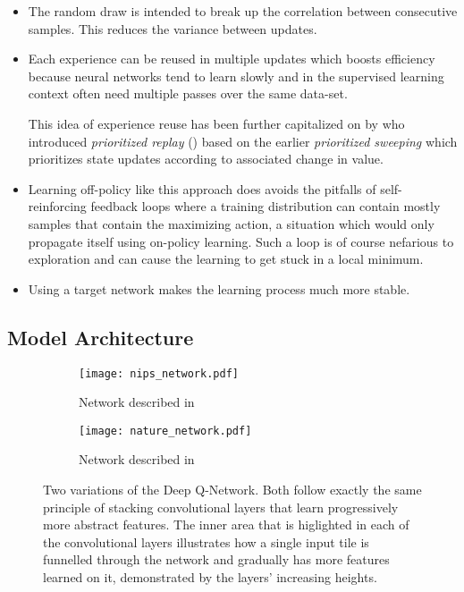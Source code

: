 \begin{itemize}
  \item The random draw is intended to break up the correlation
    between consecutive samples.
    This reduces the variance between updates.
  \item Each experience can be reused
    in multiple updates which boosts efficiency
    because neural networks tend to learn slowly
    and in the supervised learning context often need multiple passes
    over the same data-set.

    This idea of experience reuse has been further capitalized on by
    \citeauthor{Schaul2016} who introduced
    \textit{prioritized replay} (\citeyear{Schaul2016})
    based on the earlier \textit{prioritized sweeping} \parencite{Moore1993}
    which prioritizes state updates according to associated change in value.
  \item Learning off-policy like this approach does
    avoids the pitfalls of self-reinforcing feedback loops
    where a training distribution can contain mostly samples
    that contain the maximizing action,
    a situation which would only propagate itself using on-policy learning.
    Such a loop is of course nefarious to exploration
    and can cause the learning to get stuck in a local minimum.
  \item Using a target network makes the learning process much more stable.
\end{itemize}


\subsection{Model Architecture}
\label{sub:model_architecture}

\begin{figure}[h]
\center
\begin{subfigure}[b]{.49\textwidth}
  \centering
  \texttt{[image: nips\_network.pdf]}
  \vspace{.1\baselineskip}
  \caption{Network described in \cite{Mnih2013}}
  \label{fig:nips_network}
\end{subfigure}
\begin{subfigure}[b]{.49\textwidth}
  \centering
  \texttt{[image: nature\_network.pdf]}
  \vspace{.1\baselineskip}
  \caption{Network described in \cite{Mnih2015}}
  \label{fig:nature_network}
\end{subfigure}
\caption[Original Deep Q-Networks]{
Two variations of the Deep Q-Network.
Both follow exactly the same principle
of stacking convolutional layers
that learn progressively more abstract features.
The inner area that is higlighted in each of the convolutional layers
illustrates how a single input tile is funnelled through the network
and gradually has more features learned on it,
demonstrated by the layers' increasing heights.
}
\label{fig:dqn_networks}
\end{figure}


